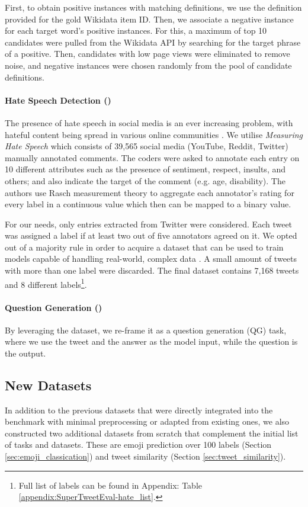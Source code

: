 First, to obtain positive instances with matching definitions, we use the definition provided for the gold Wikidata item ID. Then, we associate a negative instance for each target word's positive instances. For this, a maximum of top 10 candidates were pulled from the Wikidata API by searching for the target phrase of a positive. Then, candidates with low page views were eliminated to remove noise, and negative instances were chosen randomly from the pool of candidate definitions.

\paragraph{Hate Speech Detection ({\TweetHate})} The presence of hate speech in social media is an ever increasing problem, with hateful content being spread in various online communities \cite{udanor2019combating, walther2021us}. We utilise \textit{Measuring Hate Speech} \cite{sachdeva-etal-2022-measuring} which consists of 39,565  social media (YouTube, Reddit, Twitter) manually annotated comments. The coders were asked to annotate each entry on 10 different attributes such as the presence of sentiment, respect, insults, and others; and also indicate the target of the comment (e.g. age, disability). The authors use Rasch measurement theory \cite{rasch1960studies} to aggregate each annotator's rating for every label in a continuous value which then can be mapped to a binary value.

For our needs, only entries extracted from Twitter were considered. Each tweet was assigned a label if at least two out of five annotators agreed on it. We opted out of a majority rule in order to acquire a dataset that can be used to train models capable of handling real-world, complex data \cite{mohammad-etal-2018-semeval,antypas-etal-2022-twitter}. A small amount of tweets with more than one label were discarded. The final dataset contains 7,168 tweets and 8 different labels\footnote{Full list of labels can be found in Appendix: Table \ref{appendix:SuperTweetEval-hate_list}.}. 

\paragraph{Question Generation ({\TweetQG})} By leveraging the {\TweetQA} dataset, we re-frame it as a question generation (QG) task, where we use the tweet and the answer as the model input, while the question is the output.

\subsection{New Datasets}
In addition to the previous datasets that were directly integrated into the benchmark with minimal preprocessing or adapted from existing ones, we also constructed two additional datasets from scratch that complement the initial list of tasks and datasets. These are emoji prediction over 100 labels (Section \ref{sec:emoji_classication}) and tweet similarity (Section \ref{sec:tweet_similarity}).


